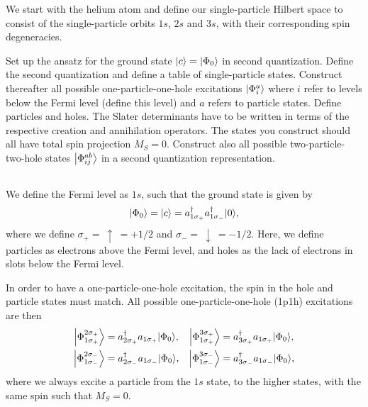 We start with the helium atom and define our single-particle Hilbert
space to consist of the single-particle orbits \(1s\), \(2s\) and \(3s\),
with their corresponding spin degeneracies.

Set up the ansatz for the ground state \(\ket*{c} = \ket*{\Phi_0}\) in second quantization.
Define the second quantization and define a table of single-particle states.
Construct thereafter all possible one-particle-one-hole
excitations \(\ket*{\Phi_i^a}\) where \(i\) refer to levels below the Fermi level (define this level) and \(a\) refers to particle states.
Define particles and holes.
The Slater determinants have to be written in terms of the respective creation and annihilation operators.
The states you construct should all have total spin projection \(M_S=0\).
Construct also all possible two-particle-two-hole states \(\ket*{\Phi_{ij}^{ab}}\) in a second quantization
representation.

\subsection{}
We define the Fermi level as \(1s\), such that the ground state is given by
\begin{equation}
    \ket*{\Phi_0} = \ket*{c} = a_{1\sigma_{+}}^\dagger a_{1\sigma_{-}}^\dagger \ket*{0},
\end{equation}
where we define $\sigma_{+} = \ \uparrow \ = +1/2$ and $\sigma_{-} = \ \downarrow \ = -1/2$.
Here, we define particles as electrons above the Fermi level, and holes as the lack of electrons in slots below the Fermi level.

In order to have a one-particle-one-hole excitation, the spin in the hole and particle states must match.
All possible one-particle-one-hole (1p1h) excitations are then
\begin{align*}
    \ket*{\Phi_{1\sigma_{+}}^{2\sigma_{+}}} &= a_{2\sigma_{+}}^\dagger a_{1\sigma_{+}} \ket*{\Phi_0}, &
    \ket*{\Phi_{1\sigma_{+}}^{3\sigma_{+}}} &= a_{3\sigma_{+}}^\dagger a_{1\sigma_{+}} \ket*{\Phi_0}, \\
    \ket*{\Phi_{1\sigma_{-}}^{2\sigma_{-}}} &= a_{2\sigma_{-}}^\dagger a_{1\sigma_{-}} \ket*{\Phi_0}, &
    \ket*{\Phi_{1\sigma_{-}}^{3\sigma_{-}}} &= a_{3\sigma_{-}}^\dagger a_{1\sigma_{-}} \ket*{\Phi_0},
\end{align*}
where we always excite a particle from the $1s$ state, to the higher states, with the same spin such that $M_S = 0$.

